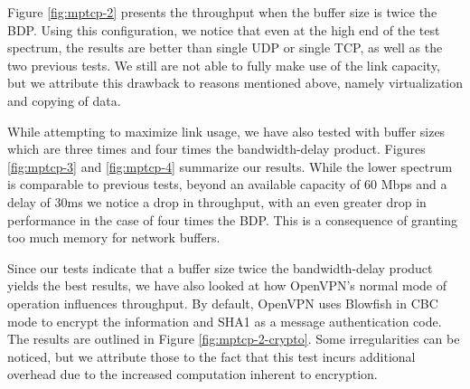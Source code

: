 Figure \ref{fig:mptcp-2} presents the throughput when the buffer size is twice
the BDP. Using this configuration, we notice that even at the high end of the
test spectrum, the results are better than single UDP or single TCP, as well
as the two previous tests. We still are not able to fully make use of the link
capacity, but we attribute this drawback to reasons mentioned above, namely
virtualization and copying of data.

While attempting to maximize link usage, we have also tested with buffer sizes
which are three times and four times the bandwidth-delay product. Figures
\ref{fig:mptcp-3} and \ref{fig:mptcp-4} summarize our results. While the lower
spectrum is comparable to previous tests, beyond an available capacity of 60 Mbps
and a delay of 30ms we notice a drop in throughput, with an even greater drop
in performance in the case of four times the BDP. This is a consequence of
granting too much memory for network buffers.


Since our tests indicate that a buffer size twice the bandwidth-delay product
yields the best results, we have also looked at how OpenVPN's normal mode of
operation influences throughput. By default, OpenVPN uses Blowfish in CBC mode
to encrypt the information and SHA1 as a message authentication code. The
results are outlined in Figure \ref{fig:mptcp-2-crypto}. Some irregularities can be
noticed, but we attribute those to the fact that this test incurs additional
overhead due to the increased computation inherent to encryption.

